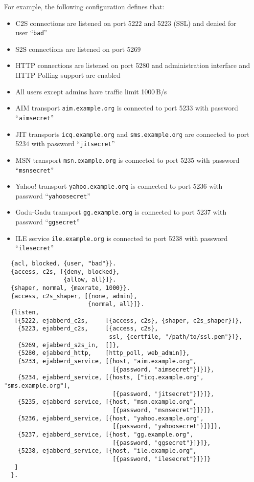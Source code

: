 \documentclass[a4paper,10pt]{article}
\newcommand{\jid}[1]{\texttt{#1}}
\newcommand{\term}[1]{\texttt{#1}}
\begin{document}
For example, the following configuration defines that:
\begin{itemize}
\item C2S connections are listened on port 5222 and 5223 (SSL) and denied for
  user ``\term{bad}''
\item S2S connections are listened on port 5269
\item HTTP connections are listened on port 5280 and administration interface
  and HTTP Polling support are enabled
\item All users except admins have traffic limit 1000\,B/s
\item AIM transport \jid{aim.example.org} is connected to port 5233 with
  password ``\term{aimsecret}''
\item JIT transports \jid{icq.example.org} and \jid{sms.example.org} are
  connected to port 5234 with password ``\term{jitsecret}''
\item MSN transport \jid{msn.example.org} is connected to port 5235 with
  password ``\term{msnsecret}''
\item Yahoo! transport \jid{yahoo.example.org} is connected to port 5236 with
  password ``\term{yahoosecret}''
\item Gadu-Gadu transport \jid{gg.example.org} is connected to port 5237 with
  password ``\term{ggsecret}''
\item ILE service \jid{ile.example.org} is connected to port 5238 with
  password ``\term{ilesecret}''
\end{itemize}
\begin{verbatim}
  {acl, blocked, {user, "bad"}}.
  {access, c2s, [{deny, blocked},
                 {allow, all}]}.
  {shaper, normal, {maxrate, 1000}}.
  {access, c2s_shaper, [{none, admin},
                        {normal, all}]}.
  {listen,
   [{5222, ejabberd_c2s,     [{access, c2s}, {shaper, c2s_shaper}]},
    {5223, ejabberd_c2s,     [{access, c2s},
                              ssl, {certfile, "/path/to/ssl.pem"}]},
    {5269, ejabberd_s2s_in,  []},
    {5280, ejabberd_http,    [http_poll, web_admin]},
    {5233, ejabberd_service, [{host, "aim.example.org",
                               [{password, "aimsecret"}]}]},
    {5234, ejabberd_service, [{hosts, ["icq.example.org", "sms.example.org"],
                               [{password, "jitsecret"}]}]},
    {5235, ejabberd_service, [{host, "msn.example.org",
                               [{password, "msnsecret"}]}]},
    {5236, ejabberd_service, [{host, "yahoo.example.org",
                               [{password, "yahoosecret"}]}]},
    {5237, ejabberd_service, [{host, "gg.example.org",
                               [{password, "ggsecret"}]}]},
    {5238, ejabberd_service, [{host, "ile.example.org",
                               [{password, "ilesecret"}]}]}
   ]
  }.
\end{verbatim}
\end{document}
